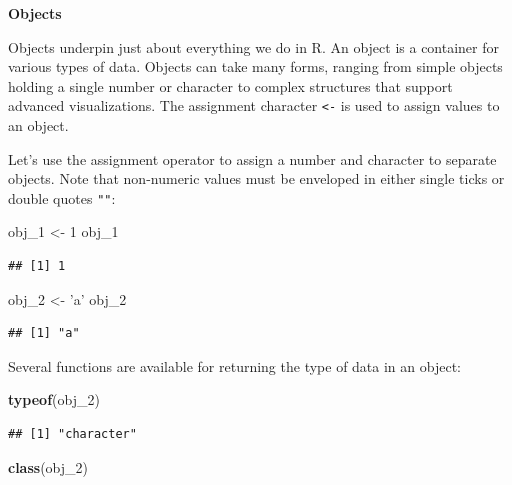 \documentclass[]{book}
\newenvironment{Shaded}{\begin{snugshade}}{\end{snugshade}}
\newcommand{\DecValTok}[1]{\textcolor[rgb]{0.00,0.00,0.81}{#1}}
\newcommand{\KeywordTok}[1]{\textcolor[rgb]{0.13,0.29,0.53}{\textbf{#1}}}
\newcommand{\NormalTok}[1]{#1}
\newcommand{\StringTok}[1]{\textcolor[rgb]{0.31,0.60,0.02}{#1}}
\begin{document}
\textbf{Objects}

Objects underpin just about everything we do in R. An object is a container for various types of data. Objects can take many forms, ranging from simple objects holding a single number or character to complex structures that support advanced visualizations. The assignment character \texttt{\textless{}-} is used to assign values to an object.

Let's use the assignment operator to assign a number and character to separate objects. Note that non-numeric values must be enveloped in either single ticks \texttt{\textquotesingle{}\textquotesingle{}} or double quotes \texttt{""}:

\begin{Shaded}
\begin{Highlighting}[]
\NormalTok{obj_}\DecValTok{1}\NormalTok{ <-}\StringTok{ }\DecValTok{1}
\NormalTok{obj_}\DecValTok{1}
\end{Highlighting}
\end{Shaded}

\begin{verbatim}
## [1] 1
\end{verbatim}

\begin{Shaded}
\begin{Highlighting}[]
\NormalTok{obj_}\DecValTok{2}\NormalTok{ <-}\StringTok{ 'a'}
\NormalTok{obj_}\DecValTok{2}
\end{Highlighting}
\end{Shaded}

\begin{verbatim}
## [1] "a"
\end{verbatim}

Several functions are available for returning the type of data in an object:

\begin{Shaded}
\begin{Highlighting}[]
\KeywordTok{typeof}\NormalTok{(obj_}\DecValTok{2}\NormalTok{)}
\end{Highlighting}
\end{Shaded}

\begin{verbatim}
## [1] "character"
\end{verbatim}

\begin{Shaded}
\begin{Highlighting}[]
\KeywordTok{class}\NormalTok{(obj_}\DecValTok{2}\NormalTok{)}
\end{Highlighting}
\end{Shaded}
\end{document}
